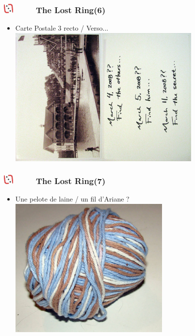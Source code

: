 \documentclass[slidetop,11pt]{beamer}
\def\sectionPartIIaIV{The Lost Ring}
\def\moreInFrameTitleLeftt{\includegraphics[height=0.5cm]{img/ligueludique-0.png}~~~~~}
\begin{document}
\begin{frame}
	\frametitle{\moreInFrameTitleLeftt \sectionPartIIaIV  (6) }
	\begin{itemize}
		\item Carte Postale 3 recto / Verso...
		\includegraphics[height=7.00cm]{img/argTheLostRing/2298573497_9faf88fc1d_o.jpg}
	\end{itemize}
\end{frame} 

\begin{frame}
	\frametitle{\moreInFrameTitleLeftt \sectionPartIIaIV  (7) }
	\begin{itemize}
		\item Une pelote de laine / un fil d'Ariane ?
		\includegraphics[height=7.00cm]{img/argTheLostRing/2299401072_b1ddc63acc_o.jpg}
	\end{itemize}
\end{frame}
\end{document}
